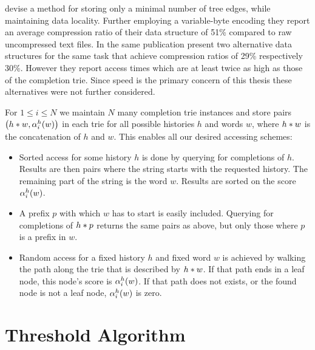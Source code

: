 \textcite{HsuOttaviano2013} devise a method for storing only a minimal number of
tree edges, while maintaining data locality.
Further employing a variable-byte encoding they report an average compression
ratio of their data structure of 51\% compared to raw uncompressed text files.
In the same publication \textcite{HsuOttaviano2013} present two alternative
data structures for the same task that achieve compression ratios of 29\%
respectively 30\%.
However they report access times which are at least twice as high as those
of the completion trie.
Since speed is the primary concern of this thesis these alternatives
were not further considered.

For $1 \leq i \leq N$ we maintain $N$ many completion trie instances and store
pairs $\left(h * w, \alpha^h_i(w)\right)$ in each trie for all possible
histories $h$ and words $w$, where $h * w$ is the concatenation of
$h$ and $w$.
This enables all our desired accessing schemes:
\begin{itemize}
  \item Sorted access for some history $h$ is done by querying for completions
    of $h$.
    Results are then pairs where the string starts with the requested
    history.
    The remaining part of the string is the word $w$.
    Results are sorted on the score $\alpha^h_i(w)$.
  \item A prefix $p$ with which $w$ has to start is easily included.
    Querying for completions of $h * p$ returns the same pairs as above, but only
    those where $p$ is a prefix in $w$.
  \item Random access for a fixed history $h$ and fixed word $w$ is achieved by
    walking the path along the trie that is described by $h * w$.
    If that path ends in a leaf node, this node's score is $\alpha^h_i(w)$.
    If that path does not exists, or the found node is not a leaf node,
    $\alpha^h_i(w)$ is zero.
\end{itemize}

\section{Threshold Algorithm}

